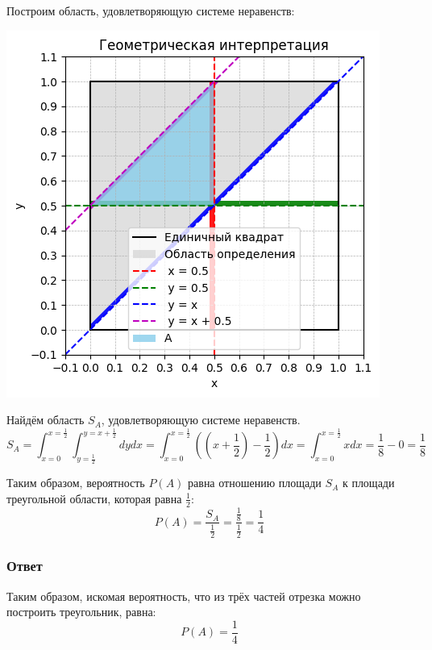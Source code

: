 \documentclass[a4paper,14pt]{extarticle}
\begin{document}
                Построим область, удовлетворяющую системе неравенств:
                
                \begin{center}
                    \includegraphics[scale=0.7]{2_graphics.png}
                \end{center}
                
                
                
                Найдём область \( S_A \), удовлетворяющую системе неравенств.
                \[
                    S_A =
                    \int_{x = 0}^{x = \frac{1}{2}}
                    \int_{y = \frac{1}{2}}^{y = x + \frac{1}{2}} dy dx =
                    \int_{x = 0}^{x = \frac{1}{2}}
                    ((x + \frac{1}{2}) - \frac{1}{2}) dx =
                    \int_{x = 0}^{x = \frac{1}{2}} x dx =
                    \frac{1}{8} - 0 = \frac{1}{8}
                \]
                
                Таким образом, вероятность \( P(A) \) равна отношению площади \( S_A \) к площади треугольной области, которая равна \( \frac{1}{2} \):
                \[
                    P(A) = \frac{S_A}{\frac{1}{2}} = \frac{\frac{1}{8}}{\frac{1}{2}} = \frac{1}{4}
                \]
            
            \subsubsection*{Ответ}
                Таким образом, искомая вероятность, что из трёх частей отрезка можно построить треугольник, равна:
                \[
                    \boxed{P(A) = \frac{1}{4}}
                \]
        
\end{document}
